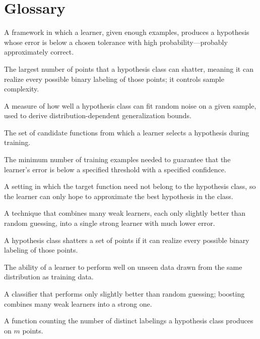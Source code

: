 \section*{Glossary}
\begin{description}[leftmargin=*,style=nextline,itemsep=0.3em]
\item[\textbf{PAC learning.}] A framework in which a learner, given enough examples, produces a hypothesis whose error is below a chosen tolerance with high probability---probably approximately correct.
\item[\textbf{VC dimension.}] The largest number of points that a hypothesis class can shatter, meaning it can realize every possible binary labeling of those points; it controls sample complexity.
\item[\textbf{Rademacher complexity.}] A measure of how well a hypothesis class can fit random noise on a given sample, used to derive distribution-dependent generalization bounds.
\item[\textbf{Hypothesis class.}] The set of candidate functions from which a learner selects a hypothesis during training.
\item[\textbf{Sample complexity.}] The minimum number of training examples needed to guarantee that the learner's error is below a specified threshold with a specified confidence.
\item[\textbf{Agnostic learning.}] A setting in which the target function need not belong to the hypothesis class, so the learner can only hope to approximate the best hypothesis in the class.
\item[\textbf{Boosting.}] A technique that combines many weak learners, each only slightly better than random guessing, into a single strong learner with much lower error.
\item[\textbf{Shatter.}] A hypothesis class shatters a set of points if it can realize every possible binary labeling of those points.
\item[\textbf{Generalization.}] The ability of a learner to perform well on unseen data drawn from the same distribution as training data.
\item[\textbf{Weak learner.}] A classifier that performs only slightly better than random guessing; boosting combines many weak learners into a strong one.
\item[\textbf{Growth function.}] A function counting the number of distinct labelings a hypothesis class produces on $m$ points.
\end{description}

